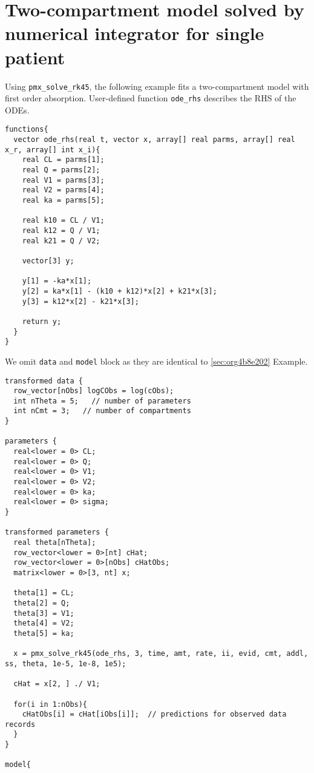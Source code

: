 \documentclass[12pt, reqno, oneside]{amsbook}
\numberwithin{equation}{chapter}
\numberwithin{figure}{chapter}
\numberwithin{table}{chapter}
\theoremstyle{remark}
\begin{document}
\section{Two-compartment model solved by numerical integrator for single patient}
\label{sec:org1ae9370}
Using \texttt{pmx\_solve\_rk45}, the following example fits a two-compartment model
with first order absorption. User-defined function
\texttt{ode\_rhs} describes the RHS of the ODEs.
\begin{verbatim}
functions{
  vector ode_rhs(real t, vector x, array[] real parms, array[] real x_r, array[] int x_i){
    real CL = parms[1];
    real Q = parms[2];
    real V1 = parms[3];
    real V2 = parms[4];
    real ka = parms[5];

    real k10 = CL / V1;
    real k12 = Q / V1;
    real k21 = Q / V2;

    vector[3] y;

    y[1] = -ka*x[1];
    y[2] = ka*x[1] - (k10 + k12)*x[2] + k21*x[3];
    y[3] = k12*x[2] - k21*x[3];

    return y;
  }
}
\end{verbatim}

We omit \texttt{data} and
\texttt{model} block as they are identical to \ref{sec:org4b8e202} Example.

\begin{verbatim}
transformed data {
  row_vector[nObs] logCObs = log(cObs);
  int nTheta = 5;   // number of parameters
  int nCmt = 3;   // number of compartments
}

parameters {
  real<lower = 0> CL;
  real<lower = 0> Q;
  real<lower = 0> V1;
  real<lower = 0> V2;
  real<lower = 0> ka;
  real<lower = 0> sigma;
}

transformed parameters {
  real theta[nTheta];
  row_vector<lower = 0>[nt] cHat;
  row_vector<lower = 0>[nObs] cHatObs;
  matrix<lower = 0>[3, nt] x;

  theta[1] = CL;
  theta[2] = Q;
  theta[3] = V1;
  theta[4] = V2;
  theta[5] = ka;

  x = pmx_solve_rk45(ode_rhs, 3, time, amt, rate, ii, evid, cmt, addl, ss, theta, 1e-5, 1e-8, 1e5);

  cHat = x[2, ] ./ V1;

  for(i in 1:nObs){
    cHatObs[i] = cHat[iObs[i]];  // predictions for observed data records
  }
}

model{
\end{verbatim}
\end{document}
